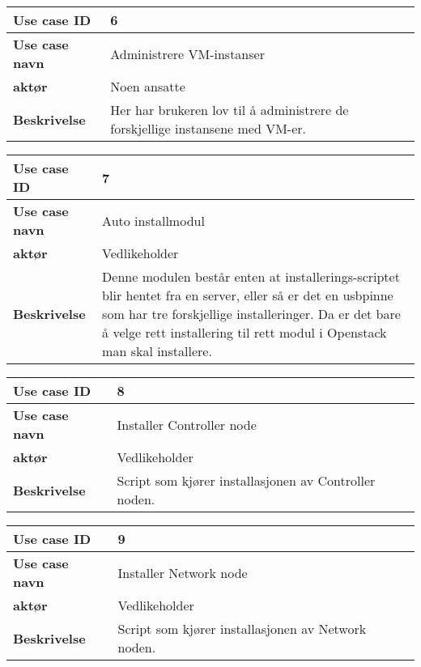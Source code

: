 \begin{table}[H]
	\begin{tabular}[Figur 7]{| p{2cm} | p{9cm} |}
		\hline \rowcolor{lightgray} \textbf{Use case ID} & 6 \\
		\hline \rowcolor{darkgray} \textbf{Use case navn} & Administrere VM-instanser \\
		\hline \rowcolor{lightgray} \textbf{aktør} & Noen ansatte\\
		\hline \rowcolor{darkgray} \textbf{Beskrivelse} & Her har brukeren lov til å administrere de forskjellige instansene med VM-er. \\
		\hline
	\end{tabular}
\end{table}

\begin{table}[H]
	\begin{tabular}[Figur 2]{| p{2cm} | p{9cm} |}
		\hline \rowcolor{lightgray} \textbf{Use case ID} & 7 \\
		\hline \rowcolor{darkgray} \textbf{Use case navn} & Auto installmodul \\
		\hline \rowcolor{lightgray} \textbf{aktør} & Vedlikeholder\\
		\hline \rowcolor{darkgray} \textbf{Beskrivelse} & Denne modulen består enten at installerings-scriptet blir hentet fra en server, eller så er det en usbpinne som har tre forskjellige installeringer. Da er det bare å velge rett installering til rett modul i Openstack man skal installere. \\
		\hline
	\end{tabular}
\end{table}

\begin{table}[H]
	\begin{tabular}[Figur 2]{| p{2cm} | p{9cm} |}
		\hline \rowcolor{lightgray} \textbf{Use case ID} & 8 \\
		\hline \rowcolor{darkgray} \textbf{Use case navn} & Installer Controller node \\
		\hline \rowcolor{lightgray} \textbf{aktør} & Vedlikeholder \\
		\hline \rowcolor{darkgray} \textbf{Beskrivelse} & Script som kjører installasjonen av Controller noden. \\ 
		\hline
	\end{tabular}
\end{table}

\begin{table}[H]
	\begin{tabular}[Figur 2]{| p{2cm} | p{9cm} |}
		\hline \rowcolor{lightgray} \textbf{Use case ID} & 9 \\
		\hline \rowcolor{darkgray} \textbf{Use case navn} & Installer Network node\\
		\hline \rowcolor{lightgray} \textbf{aktør} & Vedlikeholder \\
		\hline \rowcolor{darkgray} \textbf{Beskrivelse} & Script som kjører installasjonen av Network noden. \\
		\hline	
	\end{tabular}
\end{table}

